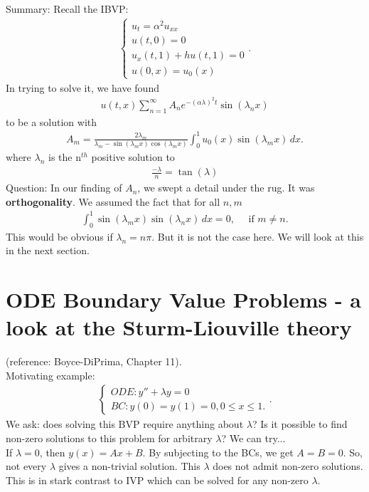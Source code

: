 \documentclass{article}
\theoremstyle{definition}
\begin{document}
\noindent Summary: Recall the IBVP:
\begin{align*}
\begin{cases}
u_t = \alpha^2 u_{xx}\\
u(t,0) = 0\\
u_x(t,1) + hu(t,1) = 0\\
u(0,x) = u_0(x) 
\end{cases}.
\end{align*}
In trying to solve it, we have found
\begin{align*}
u(t,x) \sum_{n=1}^{\infty}A_n e^{-(\alpha \lambda)^2t}\sin(\lambda_n x)
\end{align*}
to be a solution with
\begin{align*}
A_m = \frac{2\lambda_m}{\lambda_m - \sin(\lambda_m x)\cos(\lambda_m x)}\int_{0}^1 u_0(x)\sin(\lambda_m x) \,dx.
\end{align*}
where $\lambda_n$ is the n$^{th}$ positive solution to 
\begin{align*}
\frac{-\lambda}{n}= \tan(\lambda)
\end{align*}
Question: In our finding of $A_n$, we swept a detail under the rug. It was \textbf{orthogonality}. We assumed the fact that for all $n,m$
\begin{align*}
\int^1_0 \sin(\lambda_m x)\sin(\lambda_n x)\,dx = 0,\,\,\,\,\,\,\text{ if } m\neq n.
\end{align*}
This would be obvious if $\lambda_n = n\pi$. But it is not the case here. We will look at this in the next section.
\newpage
\section{ODE Boundary Value Problems - a look at the Sturm-Liouville theory}
(reference: Boyce-DiPrima, Chapter 11).\\


Motivating example:
\begin{align*}
\begin{cases}
ODE: y'' + \lambda y = 0\\
BC: y(0) = y(1) = 0, 0\leq x\leq 1.
\end{cases}.
\end{align*}
We ask: does solving this BVP require anything about $\lambda$? Is it possible to find non-zero solutions to this problem for arbitrary $\lambda$? We can try...\\

If $\lambda = 0$, then $y(x) = Ax+B$. By subjecting to the BCs, we get $A=B=0$. So, not every $\lambda$ gives a non-trivial solution. This $\lambda$ does not admit non-zero solutions. This is in stark contrast to IVP which can be solved for any non-zero $\lambda$.\\
\end{document}
